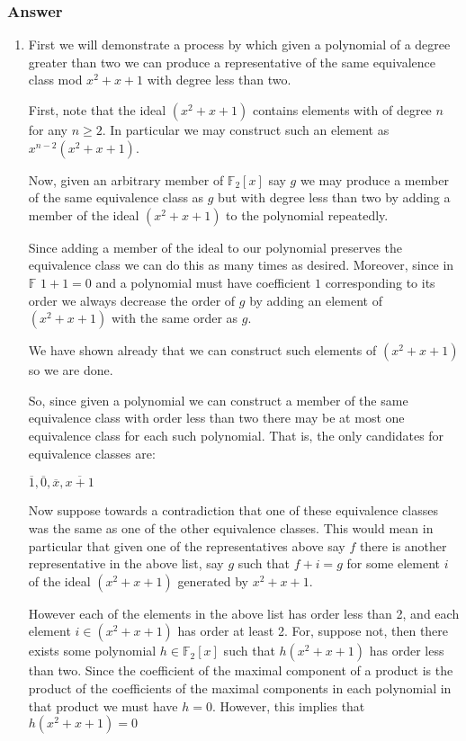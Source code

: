 \documentclass[12pt]{article}
\begin{document}
\subsubsection{Answer}
\begin{enumerate}
\item First we will demonstrate a process by which given a polynomial of a degree greater than two we can produce a representative of the same equivalence class mod $x^2 + x+1$ with degree less than two.

First, note that the ideal $(x^2+x+1)$ contains elements with of degree $n$ for any $n\geq 2 $. In particular we may construct such an element as $x^{n-2}(x^2+x+1)$. 

Now, given an arbitrary member of  $\mathbb{F}_2[x] $ say $g$ we may produce a member of the same equivalence class as $g$ but with degree less than two by adding a member of  the ideal $(x^2+x+1)$ to the polynomial repeatedly. 

Since adding a member of the ideal to our polynomial preserves the equivalence class we can do this as many times as desired. Moreover, since in $\mathbb{F}$ $1+1=0$ and a polynomial must have coefficient $1$ corresponding to its order we always decrease the order of $g$ by adding an element of $(x^2+x+1)$ with the same order as $g$.

We have shown already that we can construct such elements of $(x^2+x+1)$ so we are done. 

So, since given a polynomial we can construct a member of the same equivalence class with order less than two there may be at most one equivalence class for each such polynomial. That is, the only candidates for equivalence classes are: 

$\overline{1}, \overline{0}, \overline{x}, \overline{x+1}$

Now suppose towards a contradiction that one of these equivalence classes was the same as one of the other equivalence classes. This would mean in particular that given one of the representatives above say $f$ there is another representative in the above list, say $g$ such that $f+ i =g$ for some element $i$ of the ideal $(x^2+x+1)$ generated by $x^2+x+1$.

However each of the elements in the above list has order less than 2, and each element $i \in (x^2+x+1) $ has order at least 2. For, suppose not, then there exists some polynomial $h \in \mathbb{F}_2[x]$ such that $h(x^2+x+1)$ has order less than two. Since the coefficient of the maximal component of a product is the product of the coefficients of the maximal components in each polynomial in that product we must have $h=0$. However, this implies that $h(x^2+x+1)=0$


\end{enumerate}
\end{document}
